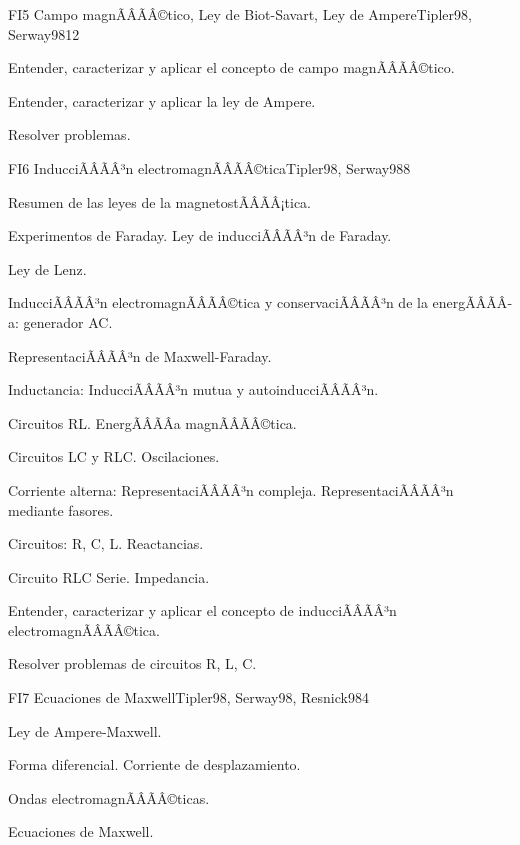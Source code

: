 \begin{sumilla}
\begin{unit}{FI5 Campo magnÃÂÃÂ©tico, Ley de Biot-Savart, Ley de Ampere}{Tipler98, Serway98}{12}
   \begin{objetivos}
         \item  Entender, caracterizar y aplicar el concepto de campo magnÃÂÃÂ©tico.
         \item  Entender, caracterizar y aplicar la ley de Ampere.
         \item  Resolver problemas.
   \end{objetivos}
\end{unit}

\begin{unit}{FI6 InducciÃÂÃÂ³n electromagnÃÂÃÂ©tica}{Tipler98, Serway98}{8}
   \begin{topicos}
         \item  Resumen de las leyes de la magnetostÃÂÃÂ¡tica.
	 \item  Experimentos de Faraday.  Ley de inducciÃÂÃÂ³n de Faraday.
         \item  Ley de Lenz.
	 \item  InducciÃÂÃÂ³n electromagnÃÂÃÂ©tica y conservaciÃÂÃÂ³n de la energÃÂÃÂ­a: generador AC.
         \item  RepresentaciÃÂÃÂ³n de Maxwell-Faraday.
         \item  Inductancia: InducciÃÂÃÂ³n mutua y autoinducciÃÂÃÂ³n.
         \item  Circuitos RL.  EnergÃÂÃÂ­a magnÃÂÃÂ©tica.
         \item  Circuitos LC y RLC. Oscilaciones.
         \item  Corriente alterna: RepresentaciÃÂÃÂ³n compleja. RepresentaciÃÂÃÂ³n mediante fasores.
	 \item  Circuitos: R, C, L. Reactancias.
         \item  Circuito RLC Serie.  Impedancia.
   \end{topicos}

   \begin{objetivos}
         \item  Entender, caracterizar y aplicar el concepto de inducciÃÂÃÂ³n electromagnÃÂÃÂ©tica.
         \item  Resolver problemas de circuitos R, L, C.
   \end{objetivos}
\end{unit}

\begin{unit}{FI7 Ecuaciones de Maxwell}{Tipler98, Serway98, Resnick98}{4}
   \begin{topicos}
         \item  Ley de Ampere-Maxwell.
	 \item  Forma diferencial. Corriente de desplazamiento.
         \item  Ondas electromagnÃÂÃÂ©ticas.
	 \item  Ecuaciones de Maxwell.
   \end{topicos}


\end{unit}
\end{sumilla}
